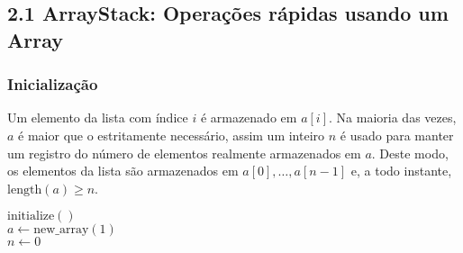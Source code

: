 \documentclass{beamer}
\begin{document}
\subsection{2.1 ArrayStack: Operações rápidas usando um Array }
\begin{frame}
\frametitle{Inicialização}
 Um elemento da lista com índice $\ensuremath{\ensuremath{\ensuremath{\mathit{i}}}}$ é armazenado em $\ensuremath{\ensuremath{\ensuremath{\mathit{a}}[\ensuremath{\mathit{i}}]}}$.  Na maioria das vezes, $\ensuremath{\ensuremath{\ensuremath{\mathit{a}}}}$ é maior que o estritamente necessário,
assim um inteiro $\ensuremath{\ensuremath{\ensuremath{\mathit{n}}}}$ é usado para manter um registro do número de elementos realmente armazenados em $\ensuremath{\ensuremath{\ensuremath{\mathit{a}}}}$.  Deste modo, os elementos da lista são armazenados em $
\ensuremath{\ensuremath{\ensuremath{\mathit{a}}[0]}},\ldots,\ensuremath{\ensuremath{\ensuremath{\mathit{a}}[\ensuremath{\mathit{n}}-1]}}$ e, a todo instante, $\ensuremath{\ensuremath{\mathrm{length}(\ensuremath{\mathit{a}})}} \ge \ensuremath{\ensuremath{\ensuremath{\mathit{n}}}}$.

\begin{oframed}
\begin{flushleft}
\hspace*{1em} $\ensuremath{\mathrm{initialize}()}$\\
\hspace*{1em} \hspace*{1em} $\ensuremath{\ensuremath{\mathit{a}} \gets  \ensuremath{\mathrm{new\_array}(1)}}$\\
\hspace*{1em} \hspace*{1em} $\ensuremath{\ensuremath{\mathit{n}} \gets  \ensuremath{0}}$\\
\end{flushleft}
\end{oframed}

\end{frame}
\end{document}
